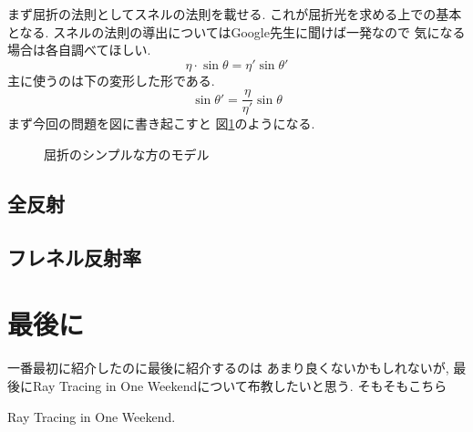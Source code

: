 \documentclass[a4paper, xelatex, ja=standard]{bxjsarticle}
\begin{document}
まず屈折の法則としてスネルの法則を載せる.
これが屈折光を求める上での基本となる.
スネルの法則の導出についてはGoogle先生に聞けば一発なので
気になる場合は各自調べてほしい.
\begin{equation}
\eta\cdot\sin{\theta}=\eta'\sin{\theta'}
\end{equation}
主に使うのは下の変形した形である.
\begin{equation}
\sin{\theta'}=\frac{\eta}{\eta'}\sin{\theta}
\end{equation}
まず今回の問題を図に書き起こすと
図\ref{fig:light-refraction-simple}のようになる.
\begin{figure}[h]
\centering
\caption{屈折のシンプルな方のモデル}
\label{fig:light-refraction-simple}
\end{figure}

\subsection{全反射}

\subsection{フレネル反射率}

\section{最後に}
一番最初に紹介したのに最後に紹介するのは
あまり良くないかもしれないが,
最後にRay Tracing in One Weekendについて布教したいと思う.
そもそもこちら

\begin{thebibliography}{9}
 Ray Tracing in One Weekend.
\end{thebibliography}
\end{document}
